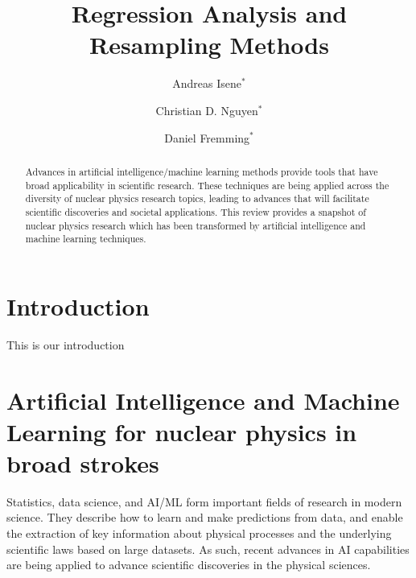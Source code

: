 \documentclass[aps,rmp,reprint,amsmath,amssymb,graphicx,longbibliography]{revtex4-1}
\begin{document}

\title{Regression Analysis and Resampling Methods}

\author{Andreas Isene$^*$}
\author{Christian D. Nguyen$^*$}
\author{Daniel Fremming$^*$}


\begin{abstract}
    Advances in artificial intelligence/machine learning methods provide tools that have broad applicability in scientific research.  These techniques are being applied across the diversity of nuclear physics research topics, leading to advances that will facilitate scientific discoveries and societal applications.
    This review provides a snapshot of nuclear physics research  which has been transformed by  artificial intelligence and machine learning techniques.
\end{abstract}

\maketitle
\def\thefootnote{*}\def\thefootnote{\arabic{footnote}}

\tableofcontents

\section{Introduction}

This is our introduction

\section{Artificial Intelligence and Machine Learning for nuclear physics in broad strokes}


 Statistics, data science, and AI/ML form important fields of research
 in modern science. They describe how to learn and make predictions
 from data, and enable the extraction of key information about
 physical processes and the underlying scientific laws based on large
 datasets. As such, recent advances in AI capabilities are being
 applied to advance scientific discoveries in the physical sciences.
\end{document}
